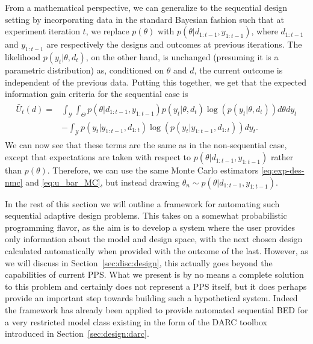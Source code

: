 From a mathematical perspective, we can generalize to the sequential design setting by 
incorporating data in the standard Bayesian fashion such that
at experiment iteration $t$, we replace $p\left(\theta\right)$ with 
$p\left(\theta | d_{1:t-1}, y_{1:t-1}\right)$, where $d_{1:t-1}$ and  $y_{1:t-1}$ are 
respectively the designs and outcomes at previous iterations.
The likelihood $p\left(y_t | \theta, d_t\right)$, on the other hand, is unchanged (presuming it 
is a parametric distribution) as, conditioned on 
$\theta$ and $d$, the current outcome is independent of the previous data.
Putting this together, we get that the expected information gain criteria for the
sequential case is
\begin{align}
\label{eq:u_bar_seq}
\begin{split}
\bar{U}_t(d)
=&\int_{\mathcal{Y}}\int_{\Theta} p\left(\theta | d_{1:t-1}, y_{1:t-1}\right)
p(y_t | \theta, d_t) \log(p(y_t | \theta, d_t)) d\theta dy_t \\
&- \int_{\mathcal{Y}} p(y_t | y_{1:t-1}, d_{1:t}) \log(p(y_t | y_{1:t-1}, d_{1:t}))dy_t.
\end{split}
\end{align}
We can now see that these terms are the same as in the non-sequential case,
except that expectations are taken with respect to $p\left(\theta | d_{1:t-1}, y_{1:t-1}\right)$
rather than $p(\theta)$.  Therefore, we can use the same Monte Carlo estimators
\eqref{eq:exp-des-nmc} and \eqref{eq:u_bar_MC}, but instead drawing $\theta_n\sim p\left(\theta | d_{1:t-1}, y_{1:t-1}\right)$.

In the rest of this section we will outline a framework for automating such sequential
adaptive design problems.  This takes on a somewhat probabilistic programming flavor, as
the aim is to develop a system where the user provides only information about the model and
design space, with the next chosen design calculated automatically when provided with
the outcome of the last.  However, as we will discuss in Section~\ref{sec:disc:design}, this actually goes
beyond the capabilities of current PPS.  What we present is by no means a complete solution to
this problem and certainly does not represent a PPS itself, but it does perhaps provide an important
step towards building such a hypothetical system.   Indeed the framework has already been
applied to provide automated sequential BED for a very restricted model class existing in the form of
the DARC toolbox~\citep{vincent2017darc} introduced in Section~\ref{sec:design:darc}.

